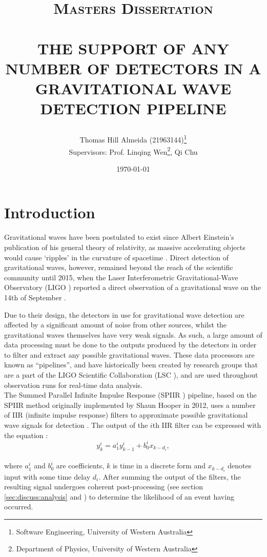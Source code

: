 \documentclass{article}
\title{\normalsize \textsc{Masters Dissertation}
        \\ [1.5cm]
        \HRule{0.5pt} \\
        \LARGE \textbf{\uppercase{The support of any number of detectors in a gravitational wave detection pipeline}}
        \HRule{2pt} \\ [0.5cm]
        \normalsize \date{\today} \vspace*{2\baselineskip}}
\author{Thomas Hill Almeida (21963144)\thanks{Software Engineering, University of Western Australia}\\
\small{Supervisors: Prof. Linqing Wen\thanks{Department of Physics, University of Western Australia}, Qi Chu\footnotemark[2]}}
\date{}
\begin{document}
\maketitle{}
\newpage{}
\tableofcontents{}
\newpage{}

\begin{minipage}[t]{0.6\textwidth}
    \centering
    \section*{} \label{sec:abstract}
\end{minipage}

\section{Introduction} \label{sec:introduction}

Gravitational waves have been postulated to exist since Albert Einstein's publication of his general theory of relativity, as massive accelerating objects would cause `ripples' in the curvature of spacetime \cite{ligo_einstein}.
Direct detection of gravitational waves, however, remained beyond the reach of the scientific community until 2015, when the Laser Interferometric Gravitational-Wave Observatory (LIGO \cite[see][]{LIGO}) reported a direct observation of a gravitational wave on the 14th of September \cite{FirstDetectionPaper, DetectionWeb}.

Due to their design, the detectors in use for gravitational wave detection are affected by a significant amount of noise from other sources, whilst the gravitational waves themselves have very weak signals.
As such, a large amount of data processing must be done to the outputs produced by the detectors in order to filter and extract any possible gravitational waves.
These data processors are known as ``pipelines'', and have historically been created by research groups that are a part of the LIGO Scientific Collaboration (LSC \cite[see][]{LSC}), and are used throughout observation runs for real-time data analysis.
\\

The Summed Parallel Infinite Impulse Response (SPIIR \cite[see][]{spiir}) pipeline, based on the SPIIR method originally implemented by Shaun Hooper in 2012, uses a number of IIR (infinite impulse response) filters to approximate possible gravitational wave signals for detection \cite{SPIIRCreate}.
The output of the \(i\)th IIR filter can be expressed with the equation \cite{SPIIRGPU2018}:
\begin{equation}
    y^i_k = a^i_1y^i_{k-1} + b^i_0x_{k-d_i},
\end{equation}
\\
where \(a^i_1\) and \(b^i_0\) are coefficients, \(k\) is time in a discrete form and \(x_{k-d_i}\) denotes input with some time delay \(d_i\).
After summing the output of the filters, the resulting signal undergoes coherent post-processing (see section \ref{sec:discuss:analysis} and \cite[chapter 4]{ChuThesis}) to determine the likelihood of an event having occurred.
\end{document}

